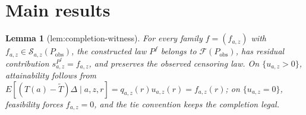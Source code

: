 \documentclass{article}
\newtheorem{lemma}{Lemma}
\begin{document}
\section{Main results}

\begin{lemma}[lem:completion-witness]\label{lem:completion-witness}
For every family \(f=(f_{a,z})\) with \(f_{a,z}\in\mathcal S_{a,z}(P_{\mathrm{obs}})\), the constructed law \(P^f\) belongs to \(\mathcal F(P_{\mathrm{obs}})\), has residual contribution \(s_{a,z}^{P^f}=f_{a,z}\), and preserves the observed censoring law. On \(\{u_{a,z}>0\}\), attainability follows from \(E[(T(a)-\widetilde T)\Delta\mid a,z,r]=q_{a,z}(r)u_{a,z}(r)=f_{a,z}(r)\); on \(\{u_{a,z}=0\}\), feasibility forces \(f_{a,z}=0\), and the tie convention keeps the completion legal.
\end{lemma}
\end{document}
